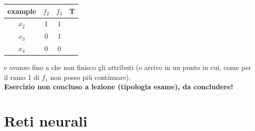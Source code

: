 \documentclass[a4paper,12pt, oneside]{book}
\begin{document}
\begin{esercizio}
  \begin{table}[H]
    \centering
    \begin{tabular}{c|c|c|c}
      example  & $f_2$ & $f_3$ & T\\
      \hline
      $x_2$ & 1 & 1 & \color{red}{0}\\
      $x_3$ & 0 & 1 & \color{darkgreen}{1}\\
      $x_4$ & 0 & 0 & \color{red}{0}\\
    \end{tabular}
  \end{table}
  e avanzo fino a che non finisco gli attributi (o arrivo in un punto in cui,
  come per il ramo 1 di $f_1$ non posso più continuare).\\
  \textbf{Esercizio non concluso a lezione (tipologia esame), da concludere!}
\end{esercizio}
\chapter{Reti neurali}
\end{document}
